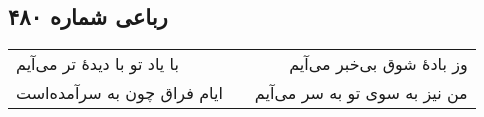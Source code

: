 \begin{center}
\section*{رباعی شماره ۴۸۰}
\label{sec:sh480}
\begin{longtable}{l p{0.5cm} r}
با یاد تو با دیدهٔ تر می‌آیم
&&
وز بادهٔ شوق بی‌خبر می‌آیم
\\
ایام فراق چون به سرآمده‌است
&&
من نیز به سوی تو به سر می‌آیم
\\
\end{longtable}
\end{center}
